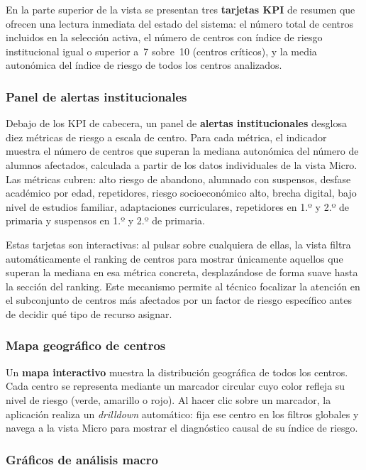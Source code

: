 En la parte superior de la vista se presentan tres \textbf{tarjetas KPI} de resumen que ofrecen una lectura inmediata del estado del sistema: el número total de centros incluidos en la selección activa, el número de centros con índice de riesgo institucional igual o superior a~7 sobre~10 (centros críticos), y la media autonómica del índice de riesgo de todos los centros analizados.

\subsubsection{Panel de alertas institucionales}

Debajo de los KPI de cabecera, un panel de \textbf{alertas institucionales} desglosa diez métricas de riesgo a escala de centro. Para cada métrica, el indicador muestra el número de centros que superan la mediana autonómica del número de alumnos afectados, calculada a partir de los datos individuales de la vista Micro. Las métricas cubren: alto riesgo de abandono, alumnado con suspensos, desfase académico por edad, repetidores, riesgo socioeconómico alto, brecha digital, bajo nivel de estudios familiar, adaptaciones curriculares, repetidores en 1.º y 2.º de primaria y suspensos en 1.º y 2.º de primaria.

Estas tarjetas son interactivas: al pulsar sobre cualquiera de ellas, la vista filtra automáticamente el ranking de centros para mostrar únicamente aquellos que superan la mediana en esa métrica concreta, desplazándose de forma suave hasta la sección del ranking. Este mecanismo permite al técnico focalizar la atención en el subconjunto de centros más afectados por un factor de riesgo específico antes de decidir qué tipo de recurso asignar.

\subsubsection{Mapa geográfico de centros}

Un \textbf{mapa interactivo} muestra la distribución geográfica de todos los centros. Cada centro se representa mediante un marcador circular cuyo color refleja su nivel de riesgo (verde, amarillo o rojo). Al hacer clic sobre un marcador, la aplicación realiza un \textit{drilldown} automático: fija ese centro en los filtros globales y navega a la vista Micro para mostrar el diagnóstico causal de su índice de riesgo.

\subsubsection{Gráficos de análisis macro}

